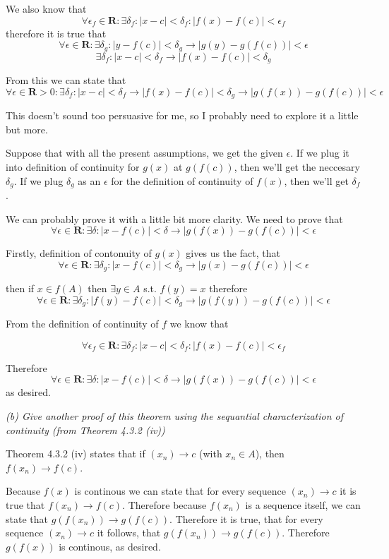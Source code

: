 \documentclass[11pt,oneside,titlepage]{book}
\begin{document}
We also know that
$$ \forall \epsilon_f \in \textbf{R}: \exists \delta_f: |x - c | < \delta_f:
|f(x) - f(c)| < \epsilon_f$$
therefore it is true that
$$ \forall \epsilon \in \textbf{R}: \exists \delta_g: |y - f(c)| < \delta_g
\to |g(y) - g(f(c))| < \epsilon $$
$$ \exists \delta_f: |x - c | < \delta_f \to
|f(x) - f(c)| < \delta_g$$

From this we can state that
$$ \forall \epsilon \in \textbf{R} > 0: \exists \delta_f: |x - c | < \delta_f \to |f(x) - f(c)| < \delta_g \to
|g(f(x)) - g(f(c))| < \epsilon $$

This doesn't sound too persuasive for me, so I probably need to explore it a
little but more.

Suppose that with all the present assumptions, we get the given $\epsilon$.
If we plug it into definition of continuity for  $g(x)$ at $g(f(c))$, then
we'll get the neccesary $\delta_g$. If we plug $\delta_g$ as an $\epsilon$
for the definition of continuity of $f(x)$, then we'll get $\delta_f$.

We can probably prove it with a little bit more clarity. We need to prove that
$$\forall \epsilon \in \textbf{R}: \exists \delta: |x - f(c)| < \delta \to
|g(f(x)) - g (f(c))| < \epsilon$$

Firstly, definition of contonuity of $g(x)$ gives us the fact, that 
$$ \forall \epsilon \in \textbf{R}: \exists \delta_g: |x - f(c)| < \delta_g
\to |g(x) - g(f(c))| < \epsilon $$

then if $x \in f(A)$ then $\exists y \in A $ s.t. $f(y) = x$ therefore
$$ \forall \epsilon \in \textbf{R}: \exists \delta_g: |f(y) - f(c)| < \delta_g
\to |g(f(y)) - g(f(c))| < \epsilon $$

From the definition of continuity of $f$ we know that 

$$ \forall \epsilon_f \in \textbf{R}: \exists \delta_f: |x - c | < \delta_f:
|f(x) - f(c)| < \epsilon_f$$

Therefore 
$$\forall \epsilon \in \textbf{R}: \exists \delta: |x - f(c)| < \delta \to
|g(f(x)) - g (f(c))| < \epsilon$$
as desired.

\textit{(b) Give another proof of this theorem using the sequantial
  characterization of continuity (from Theorem 4.3.2 (iv)) }

Theorem 4.3.2 (iv) states that if $(x_n) \to c$ (with $x_n \in A$), then
$f(x_n) \to f(c)$.

Because $f(x)$ is continous we can state that for every sequence $(x_n) \to c$
it is true that $f(x_n) \to f(c)$. Therefore because $f(x_n)$ is a sequence
itself, we can state that $g(f(x_n)) \to g(f(c))$. Therefore it is true, that
for every sequence $(x_n) \to c$ it follows, that $g(f(x_n)) \to g(f(c))$.
Therefore $g(f(x))$ is continous, as desired.
\end{document}
